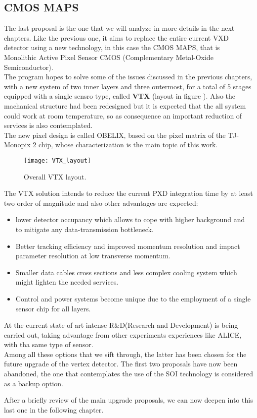 \subsection{CMOS MAPS}

The last proposal is the one that we will analyze in more details in the next chapters. Like the previous one, it aims to replace the entire current VXD detector using a new technology, in this case the CMOS MAPS, that is Monolithic Active Pixel Sensor CMOS (Complementary Metal-Oxide Semiconductor). \\
The program hopes to solve some of the issues discussed in the previous chapters, with a new system of two inner layers and three outermost, for a total of 5 stages equipped with a single sensro type, called \textbf{VTX} (layout in figure ). Also the machanical structure had been redesigned but it is expceted that the all system could work at room temperature, so as consequence an important reduction of services is also contemplated.\\
The new pixel design is called OBELIX, based on the pixel matrix of the TJ-Monopix 2 chip, whose characterization is the main topic of this work. 

\begin{figure}[h!]
\centering
\texttt{[image: VTX\_layout]}
\caption{Overall VTX layout.}
\label{VTX_layout}
\end{figure}

The VTX solution intends to reduce the current PXD integration time by at least two order of magnitude and also other advantages are expected:

\begin{itemize}
\item lower detector occupancy which allows to cope with higher background and to mitigate any data-transmission bottleneck.
\item Better tracking efficiency and improved momentum resolution and impact parameter resolution at low transverse momentum.
\item Smaller data cables cross sections and less complex cooling system which might lighten the needed services.
\item Control and power systems become unique due to the employment of a single sensor chip for all layers.
\end{itemize}

At the current state of art intense R\&D(Research and Development) is being carried out, taking advantage from other experiments experiences like ALICE, with tha same type of sensor.\\

Among all these options that we sift through, the latter has been chosen for the future upgrade of the vertex detector. The first two proposals have now been abandoned, the one that contemplates the use of the SOI technology is considered as a backup option. 

After a briefly review of the main upgrade proposals, we can now deepen into this last one in the following chapter.

